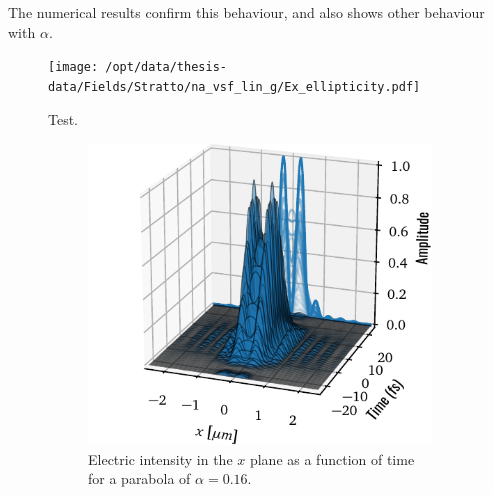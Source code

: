 \documentclass[11pt,SymmetricalJury]{inrsthesis/inrsthesis}
\begin{document}
The numerical results confirm this behaviour, and also shows other behaviour with
$\alpha$.

  \begin{figure}
    \centering
    \texttt{[image: /opt/data/thesis-data/Fields/Stratto/na\_vsf\_lin\_g/Ex\_ellipticity.pdf]}
    \caption[Ellipticity of the $E_x$ component in a linearly polarized, tightly focused beam.]
            {Test.}
    \label{fig:sc.Ex_ellipticity}
  \end{figure}


  \begin{figure}
    \begin{subfigure}{0.47\textwidth}
      \centering
      \includegraphics[width=\textwidth]{figs/ElectricIntensityTimeWaterfallf0.007.pdf}
      \caption{Electric intensity in the $x$ plane as a function of time for a
               parabola of $\alpha=0.16$.}
      \label{fig:sc.electric_intensity_waterfall7}
    \end{subfigure}
    \hfill
    \begin{subfigure}{0.47\textwidth}
      \centering

\end{subfigure}
\end{figure}
\end{document}

